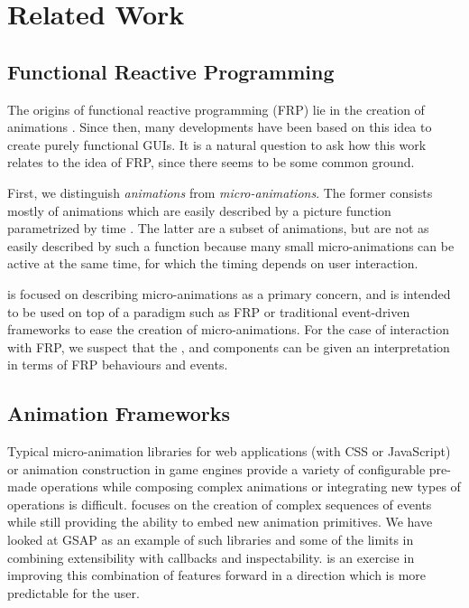 \section{Related Work}
\label{sec:related}

\subsection{Functional Reactive Programming}
The origins of functional reactive programming (FRP) lie in the creation of animations \cite{DBLP:conf/icfp/ElliottH97}. Since then, many developments have been based on this idea to create purely functional GUIs. It is a natural question to ask how this work relates to the idea of FRP, since there seems to be some common ground.

First, we distinguish \emph{animations} from \emph{micro-animations}. The former consists mostly of animations which are easily described by a picture function parametrized by time . The latter are a subset of animations, but are not as easily described by such a function because many small micro-animations can be active at the same time, for which the timing depends on user interaction.

\dsl{} is focused on describing micro-animations as a primary concern, and is intended to be used on top of a paradigm such as FRP or traditional event-driven frameworks to ease the creation of micro-animations. For the case of interaction with FRP, we suspect that the ,  and  components can be given an interpretation in terms of FRP behaviours and events.

\subsection{Animation Frameworks}

Typical micro-animation libraries for web applications (with CSS or JavaScript) or animation construction in game engines provide a variety of configurable pre-made operations while composing complex animations or integrating new types of operations is difficult. \dsl{} focuses on the creation of complex sequences of events while still providing the ability to embed new animation primitives. We have looked at GSAP as an example of such libraries and some of the limits in combining extensibility with callbacks and inspectability. \dsl{} is an exercise in improving this combination of features forward in a direction which is more predictable for the user.

